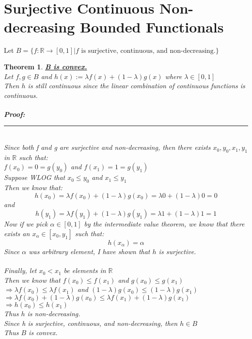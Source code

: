 \documentclass[12pt]{extarticle}
\theoremstyle{plain}
\newtheorem{thm}{Theorem}[section]
\theoremstyle{plain}
\theoremstyle{plain}
\theoremstyle{Definition}
\theoremstyle{Definition}
\theoremstyle{plain}
\theoremstyle{plain}
\newcommand{\cut}[0]{\noindent\framebox[\linewidth]{\rule{\linewidth}{2pt}}\\}
\newcommand{\prof}[0]{	\noindent \textbf{Proof:} \rule{500pt}{2pt} \\ }
\begin{document}
\section{Surjective Continuous Non-decreasing Bounded Functionals}
	Let $B = \{f : \mathbb{R} \to [0,1] | f \text{ is surjective, continuous, and non-decreasing.}\}$ \\ 
	\begin{thm} \underline{\textbf{B is convex.}} \\
			Let $f,g \in B$ and $h(x) := \lambda f(x) + (1-\lambda)g(x)$ where $\lambda \in [0,1]$ \\ 
			Then $h$ is still continuous since the linear combination of continuous functions is continuous.  \\ \\
			\prof
			Since both f and g are surjective and non-decreasing, then there exists $x_0,y_0,x_1,y_1$ in $\mathbb{R}$ such that: \\ 
			$f(x_0) = 0 = g(y_0)$ and $f(x_1) = 1 = g(y_1)$ \\ 
			Suppose WLOG that $x_0 \leq y_0$ and $x_1 \leq y_1$ \\
			Then we know that: 
			$$h(x_0) = \lambda f(x_0) + (1-\lambda)g(x_0) = \lambda 0 + (1-\lambda)0 = 0$$
			and 
			$$h(y_1) = \lambda f(y_1) + (1-\lambda)g(y_1) = \lambda 1 + (1-\lambda)1 = 1$$
			Now if we pick $\alpha \in [0,1]$ by the intermediate value theorem, we know that there exists an $x_\alpha \in [x_0,y_1]$ such that: 
			$$h(x_\alpha) = \alpha$$
			Since $\alpha$ was arbitrary element, I have shown that $h$ is surjective. \\ \\
			Finally, let $x_0 < x_1$ be elements in $\mathbb{R}$ \\ 
			Then we know that $f(x_0) \leq f(x_1)$ and $g(x_0) \leq g(x_1)$ \\ 
			$\Rightarrow \lambda f(x_0) \leq \lambda f(x_1)$ and $(1-\lambda)g(x_0) \leq (1-\lambda)g(x_1)$ \\ 
			$\Rightarrow \lambda f(x_0) + (1-\lambda)g(x_0) \leq \lambda f(x_1) + (1-\lambda)g(x_1)$ \\ 
			$\Rightarrow h(x_0) \leq h(x_1)$ \\ 
			Thus $h$ is non-decreasing. \\ 
			Since h is surjective, continuous, and non-decreasing, then $h \in B$ \\ 
			Thus $B$ is convex. 
	\end{thm}
	\cut
\end{document}
